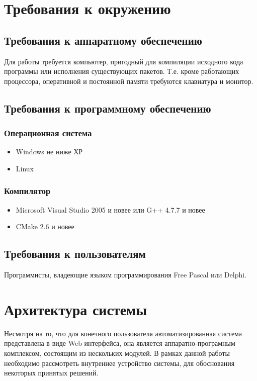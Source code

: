 \documentclass{imcs}
\begin{document}
\section{Требования к окружению}

\subsection{Требования к аппаратному обеспечению}

Для работы требуется компьютер, пригодный для компиляции исходного кода программы или исполнения существующих пакетов.
Т.е. кроме работающих процессора, оперативной и постоянной памяти требуются
клавиатура и монитор.

\subsection{Требования к программному обеспечению}

\subsubsection{Операционная система}
\begin{itemize}
    \item Windows не ниже ХР
    \item Linux
\end{itemize}

\subsubsection{Компилятор} 
\begin{itemize}
    \item Microsoft Visual Studio 2005 и новее или G++ 4.7.7 и новее
    \item CMake 2.6 и новее
\end{itemize}
    
\subsection{Требования к пользователям}
Программисты, владеющие языком программирования Free Pascal или Delphi.

\section{Архитектура системы}

Несмотря на то, что для конечного пользователя автоматизированная система представлена в виде Web интерфейса, она является аппаратно-програмным комплексом, состоящим из нескольких модулей.
В рамках данной работы необходимо рассмотреть внутреннее устройство системы, для обоснования некоторых принятых решений.

\end{document}
